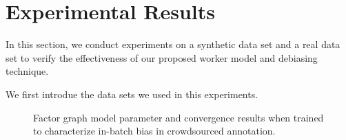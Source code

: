 \section{Experimental Results}
\label{sec:exp}

In this section, we conduct experiments on a synthetic data set and a real data set 
to verify the effectiveness of our proposed worker model and debiasing technique.  

We first introdue the data sets we used in this experiments.  


\begin{figure}[!t]
  \centering
  \caption{\label{fig:modelanalysis}Factor graph model parameter and convergence
    results when trained to characterize in-batch bias in crowdsourced annotation.
  }
\end{figure}

